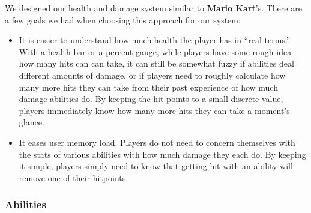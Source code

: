 \documentclass{article}
\theoremstyle{definition}
\begin{document}
We designed our health and damage system similar to \textbf{Mario Kart}'s.
There are a few goals we had when choosing this approach for our system:
\begin{itemize}
  \item It is easier to understand how much health the player has in ``real
    terms.'' With a health bar or a percent gauge, while players have some
    rough idea how many hits can can take, it can still be somewhat fuzzy if
    abilities deal different amounts of damage, or if players need to roughly
    calculate how many more hits they can take from their past experience of
    how much damage abilities do. By keeping the hit points to a small discrete
    value, players immediately know how many more hits they can take a moment's
    glance.
  \item It eases user memory load. Players do not need to concern themselves
    with the stats of various abilities with how much damage they each do. By
    keeping it simple, players simply need to know that getting hit with an
    ability will remove one of their hitpoints.
\end{itemize}

\subsubsection{Abilities}
\end{document}
